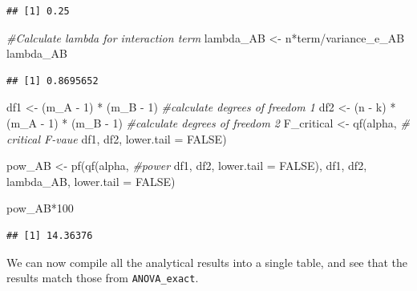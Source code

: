 \documentclass[
]{book}
\newenvironment{Shaded}{\begin{snugshade}}{\end{snugshade}}
\newcommand{\AttributeTok}[1]{\textcolor[rgb]{0.77,0.63,0.00}{#1}}
\newcommand{\CommentTok}[1]{\textcolor[rgb]{0.56,0.35,0.01}{\textit{#1}}}
\newcommand{\ConstantTok}[1]{\textcolor[rgb]{0.00,0.00,0.00}{#1}}
\newcommand{\DecValTok}[1]{\textcolor[rgb]{0.00,0.00,0.81}{#1}}
\newcommand{\FunctionTok}[1]{\textcolor[rgb]{0.00,0.00,0.00}{#1}}
\newcommand{\NormalTok}[1]{#1}
\newcommand{\OtherTok}[1]{\textcolor[rgb]{0.56,0.35,0.01}{#1}}
\newcommand{\SpecialCharTok}[1]{\textcolor[rgb]{0.00,0.00,0.00}{#1}}
\begin{document}
\begin{verbatim}
## [1] 0.25
\end{verbatim}

\begin{Shaded}
\begin{Highlighting}[]
\CommentTok{\#Calculate lambda for interaction term}
\NormalTok{lambda\_AB }\OtherTok{\textless{}{-}}\NormalTok{ n}\SpecialCharTok{*}\NormalTok{term}\SpecialCharTok{/}\NormalTok{variance\_e\_AB}
\NormalTok{lambda\_AB}
\end{Highlighting}
\end{Shaded}

\begin{verbatim}
## [1] 0.8695652
\end{verbatim}

\begin{Shaded}
\begin{Highlighting}[]
\NormalTok{df1 }\OtherTok{\textless{}{-}}\NormalTok{ (m\_A }\SpecialCharTok{{-}} \DecValTok{1}\NormalTok{) }\SpecialCharTok{*}\NormalTok{ (m\_B }\SpecialCharTok{{-}} \DecValTok{1}\NormalTok{)  }\CommentTok{\#calculate degrees of freedom 1}
\NormalTok{df2 }\OtherTok{\textless{}{-}}
\NormalTok{(n }\SpecialCharTok{{-}}\NormalTok{ k) }\SpecialCharTok{*}\NormalTok{ (m\_A }\SpecialCharTok{{-}} \DecValTok{1}\NormalTok{) }\SpecialCharTok{*}\NormalTok{ (m\_B }\SpecialCharTok{{-}} \DecValTok{1}\NormalTok{) }\CommentTok{\#calculate degrees of freedom 2}
\NormalTok{F\_critical }\OtherTok{\textless{}{-}} \FunctionTok{qf}\NormalTok{(alpha, }\CommentTok{\# critical F{-}vaue}
\NormalTok{df1,}
\NormalTok{df2,}
\AttributeTok{lower.tail =} \ConstantTok{FALSE}\NormalTok{)}

\NormalTok{pow\_AB }\OtherTok{\textless{}{-}} \FunctionTok{pf}\NormalTok{(}\FunctionTok{qf}\NormalTok{(alpha, }\CommentTok{\#power}
\NormalTok{df1,}
\NormalTok{df2,}
\AttributeTok{lower.tail =} \ConstantTok{FALSE}\NormalTok{),}
\NormalTok{df1,}
\NormalTok{df2,}
\NormalTok{lambda\_AB,}
\AttributeTok{lower.tail =} \ConstantTok{FALSE}\NormalTok{)}

\NormalTok{pow\_AB}\SpecialCharTok{*}\DecValTok{100}
\end{Highlighting}
\end{Shaded}

\begin{verbatim}
## [1] 14.36376
\end{verbatim}

We can now compile all the analytical results into a single table, and see that the results match those from \texttt{ANOVA\_exact}.
\end{document}
